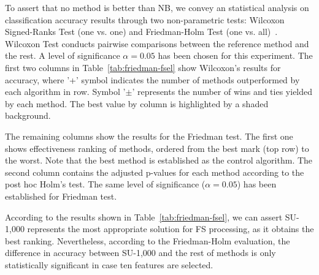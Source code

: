 \documentclass[preprint,12pt]{elsarticle}
\begin{document}
To assert that no method is better than NB, we convey an statistical analysis on classification accuracy results through two non-parametric tests: Wilcoxon Signed-Ranks Test (one vs. one) and Friedman-Holm Test (one vs. all)~\cite{garcia09, derrac11}. Wilcoxon Test conducts pairwise comparisons between the reference method and the rest. A level of significance $\alpha = 0.05$ has been chosen for this experiment. The first two columns in Table~\ref{tab:friedman-fsel} show Wilcoxon's results for accuracy, where '+' symbol indicates the number of methods outperformed by each algorithm in row. Symbol '$\pm$' represents the number of wins and ties yielded by each method. The best value by column is highlighted by a shaded background.  

The remaining columns show the results for the Friedman test. The first one shows effectiveness ranking of methods, ordered from the best mark (top row) to the worst. Note that the best method is established as the control algorithm. The second column contains the adjusted p-values for each method according to the post hoc Holm's test. The same level of significance ($\alpha = 0.05$) has been established for Friedman test.

According to the results shown in Table~\ref{tab:friedman-fsel}, we can assert SU-1,000 represents the most appropriate solution for FS processing, as it obtains the best ranking. Nevertheless, according to the Friedman-Holm evaluation, the difference in accuracy between SU-1,000 and the rest of methods is only statistically significant in case ten features are selected. 
\end{document}
